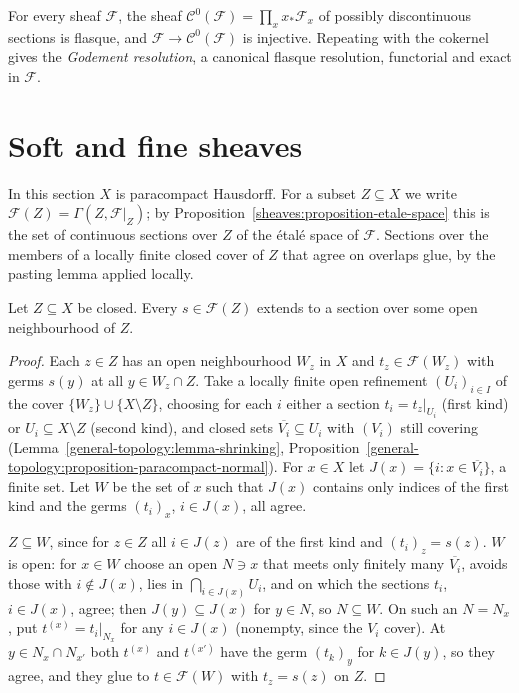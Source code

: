 \begin{example}\label{sheaves:example-godement}
For every sheaf $\mathcal{F}$, the sheaf $\mathcal{C}^0(\mathcal{F}) = \prod_x x_*\mathcal{F}_x$ of possibly discontinuous sections is flasque, and $\mathcal{F} \to \mathcal{C}^0(\mathcal{F})$ is
injective. Repeating with the cokernel gives the \emph{Godement resolution}, a canonical flasque resolution, functorial and exact in $\mathcal{F}$.
\end{example}

\section{Soft and fine sheaves}\label{sheaves:section-soft}

In this section $X$ is paracompact Hausdorff. For a subset $Z \subseteq X$ we write $\mathcal{F}(Z) = \Gamma(Z, \mathcal{F}|_Z)$; by Proposition~\ref{sheaves:proposition-etale-space}
this is the set of continuous sections over $Z$ of the \'etal\'e space of $\mathcal{F}$. Sections over the members of a locally finite closed cover of $Z$ that agree on overlaps
glue, by the pasting lemma applied locally.

\begin{lemma}\label{sheaves:lemma-closed-sections-extend}
Let $Z \subseteq X$ be closed. Every $s \in \mathcal{F}(Z)$ extends to a section over some open neighbourhood of $Z$.
\end{lemma}

\begin{proof}
Each $z \in Z$ has an open neighbourhood $W_z$ in $X$ and $t_z \in \mathcal{F}(W_z)$ with germs $s(y)$ at all $y \in W_z \cap Z$. Take a locally finite open refinement $(U_i)_{i \in I}$ of the
cover $\{W_z\} \cup \{X \setminus Z\}$, choosing for each $i$ either a section $t_i = t_z|_{U_i}$ (first kind) or $U_i \subseteq X \setminus Z$ (second kind), and closed sets
$\overline{V_i} \subseteq U_i$ with $(V_i)$ still covering (Lemma~\ref{general-topology:lemma-shrinking}, Proposition~\ref{general-topology:proposition-paracompact-normal}). For $x \in X$
let $J(x) = \{i : x \in \overline{V_i}\}$, a finite set. Let $W$ be the set of $x$ such that $J(x)$ contains only indices of the first kind and the germs $(t_i)_x$, $i \in J(x)$, all agree.

$Z \subseteq W$, since for $z \in Z$ all $i \in J(z)$ are of the first kind and $(t_i)_z = s(z)$. $W$ is open: for $x \in W$ choose an open $N \ni x$ that meets only finitely many $\overline{V_i}$,
avoids those with $i \notin J(x)$, lies in $\bigcap_{i \in J(x)}U_i$, and on which the sections $t_i$, $i \in J(x)$, agree; then $J(y) \subseteq J(x)$ for $y \in N$, so $N \subseteq W$. On such an
$N = N_x$, put $t^{(x)} = t_i|_{N_x}$ for any $i \in J(x)$ (nonempty, since the $V_i$ cover). At $y \in N_x \cap N_{x'}$ both $t^{(x)}$ and $t^{(x')}$ have the germ $(t_k)_y$ for $k \in J(y)$, so
they agree, and they glue to $t \in \mathcal{F}(W)$ with $t_z = s(z)$ on $Z$.
\end{proof}

